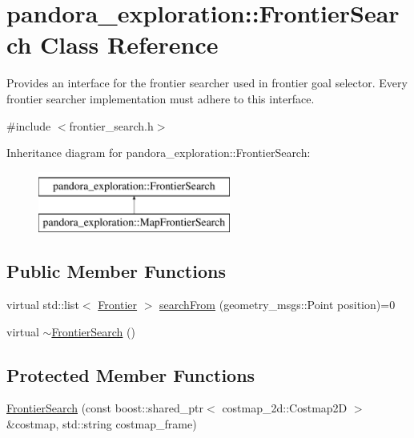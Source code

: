 \hypertarget{classpandora__exploration_1_1_frontier_search}{\section{pandora\-\_\-exploration\-:\-:\-Frontier\-Search \-Class \-Reference}
\label{classpandora__exploration_1_1_frontier_search}
}


\-Provides an interface for the frontier searcher used in frontier goal selector. \-Every frontier searcher implementation must adhere to this interface.  




{\ttfamily \#include $<$frontier\-\_\-search.\-h$>$}

\-Inheritance diagram for pandora\-\_\-exploration\-:\-:\-Frontier\-Search\-:\begin{figure}[H]
\begin{center}
\leavevmode
\includegraphics[height=2.000000cm]{classpandora__exploration_1_1_frontier_search}
\end{center}
\end{figure}
\subsection*{\-Public \-Member \-Functions}
\begin{DoxyCompactItemize}
\item 
virtual std\-::list$<$ \hyperlink{classpandora__exploration_1_1_frontier}{\-Frontier} $>$ \hyperlink{classpandora__exploration_1_1_frontier_search_ab5229aa64c1876a50f55d7c84e961cf8}{search\-From} (geometry\-\_\-msgs\-::\-Point position)=0
\item 
virtual \hyperlink{classpandora__exploration_1_1_frontier_search_a93cebcf91914dcda76c41e961ce2848d}{$\sim$\-Frontier\-Search} ()
\end{DoxyCompactItemize}
\subsection*{\-Protected \-Member \-Functions}
\begin{DoxyCompactItemize}
\item 
\hyperlink{classpandora__exploration_1_1_frontier_search_a0ea9c4a963dbbd5217d21af9fd69f5eb}{\-Frontier\-Search} (const boost\-::shared\-\_\-ptr$<$ costmap\-\_\-2d\-::\-Costmap2\-D $>$ \&costmap, std\-::string costmap\-\_\-frame)
\end{DoxyCompactItemize}
